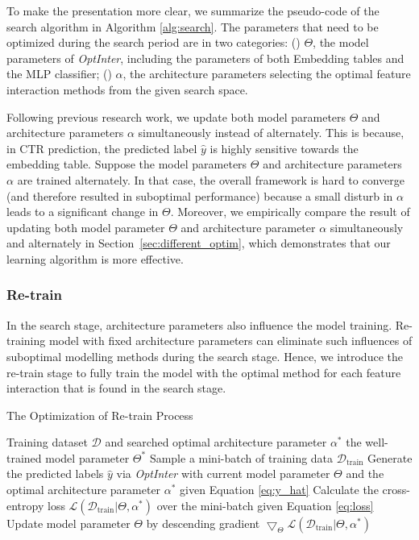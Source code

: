 \documentclass[conference]{IEEEtran}
\begin{document}
To make the presentation more clear, we summarize the pseudo-code of the search algorithm in Algorithm \ref{alg:search}. The parameters that need to be optimized during the search period are in two categories: () $\Theta$, the model parameters of \textit{OptInter}, including the parameters of both Embedding tables and the MLP classifier; () $\alpha$, the architecture parameters selecting the optimal feature interaction methods from the given search space.

Following previous research work\cite{AutoFis}, we update both model parameters $\Theta$ and architecture parameters $\alpha$ simultaneously instead of alternately. This is because, in CTR prediction, the predicted label $\hat{y}$ is highly sensitive towards the embedding table. Suppose the model parameters $\Theta$ and architecture parameters $\alpha$ are trained alternately. In that case, the overall framework is hard to converge (and therefore resulted in suboptimal performance) because a small disturb in $\alpha$ leads to a significant change in $\Theta$. 
Moreover, we empirically compare the result of updating both model parameter $\Theta$ and architecture parameter $\alpha$ simultaneously and alternately in Section~\ref{sec:different_optim}, which demonstrates that our learning algorithm is more effective.

\subsubsection{Re-train}

In the search stage, architecture parameters also influence the model training. Re-training model with fixed architecture parameters can eliminate such influences of suboptimal modelling methods during the search stage. Hence, we introduce the re-train stage to fully train the model with the optimal method for each feature interaction that is found in the search stage. 

\begin{algorithm}
    \caption{The Optimization of Re-train Process}
    \label{alg:retrain}
    \begin{algorithmic}[1]
    	\Require Training dataset $\mathcal{D}$ and searched optimal architecture parameter $\alpha^{*}$
    	\Ensure the well-trained model parameter $\Theta^*$
            \State Sample a mini-batch of training data $\mathcal{D}_{\text{train}}$
            \State Generate the predicted labels $\hat{y}$ via \textit{OptInter} with 
            \Statex \qquad current model parameter $\Theta$ and the optimal  
            \Statex \qquad architecture parameter $\alpha^{*}$ given Equation \ref{eq:y_hat}
            \State Calculate the cross-entropy loss $\mathcal{L}(\mathcal{D}_{\text{train}}|\Theta, \alpha^{*})$ over
            \Statex \qquad the mini-batch given Equation \ref{eq:loss}
            \State Update model parameter $\Theta$ by descending gradient 
            \Statex \qquad $\bigtriangledown_{\Theta} \mathcal{L}(\mathcal{D}_{\text{train}}|\Theta, \alpha^{*})$
        \EndWhile
    \end{algorithmic}
\end{algorithm}
\end{document}
